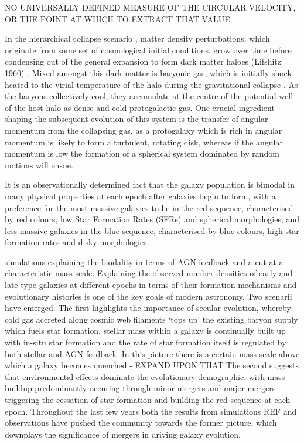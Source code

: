 \documentclass[a4paper,fleqn,usenatbib]{mn2e}
\begin{document}
NO UNIVERSALLY DEFINED MEASURE OF THE CIRCULAR VELOCITY, OR THE POINT AT WHICH TO EXTRACT THAT VALUE.

In the hierarchical collapse scenario \citep{Fall1980}, matter density perturbations, which originate from some set of cosmological initial conditions, grow over time before condensing out of the general expansion to form dark matter haloes (Lifshitz 1960) \cite{Silk1968,Peebles1970}.
Mixed amongst this dark matter is baryonic gas, which is initially shock heated to the virial temperature of the halo during the gravitational collapse \citep{Birnboim2003,Keres2005,Dekel2006}.
As the baryons collectively cool, they accumulate at the centre of the potential well of the host halo as dense and cold protogalactic gas.
One crucial ingredient shaping the subsequent evolution of this system is the transfer of angular momentum from the collapsing gas, as a protogalaxy which is rich in angular momentum is likely to form a turbulent, rotating disk, whereas if the angular momentum is low the formation of a spherical system dominated by random motions will ensue.

It is an observationally determined fact that the galaxy population is bimodal in many physical properties at each epoch after galaxies begin to form, with a preference for the most massive galaxies to lie in the red sequence, characterised by red colours, low Star Formation Rates (SFRs) and spherical morphologies, and less massive galaxies in the blue sequence, characterised by blue colours, high star formation rates and disky morphologies. 
\citep{Abramson2016,Abramson2016a}
\citep{Pannella2009a}

\citep{Baldry2006}
simulations explaining the biodality in terms of AGN feedback and a cut at a characteristic mass scale.
\citep{Birnboim2003,Dekel2006,Keres2005,Bower2006,Croton2006}
Explaining the observed number densities of early and late type galaxies at different epochs in terms of their formation mechanisms and evolutionary histories is one of the key goals of modern astronomy.
Two scenarii have emerged. The first highlights the importance of secular evolution, whereby cold gas accreted along cosmic web filaments `tops up' the existing baryon supply which fuels star formation, stellar mass within a galaxy is continually built up with in-situ star formation and the rate of star formation itself is regulated by both stellar and AGN feedback.
In this picture there is a certain mass scale above which a galaxy becomes quenched - EXPAND UPON THAT
The second suggests that environmental effects dominate the evolutionary demographic, with mass buildup predominantly occuring through minor mergers and major mergers triggering the cessation of star formation and building the red sequence at each epoch.  
Throughout the last few years both the results from simulations REF and observations have pushed the community towards the former picture, which downplays the significance of mergers in driving galaxy evolution. 
\end{document}
